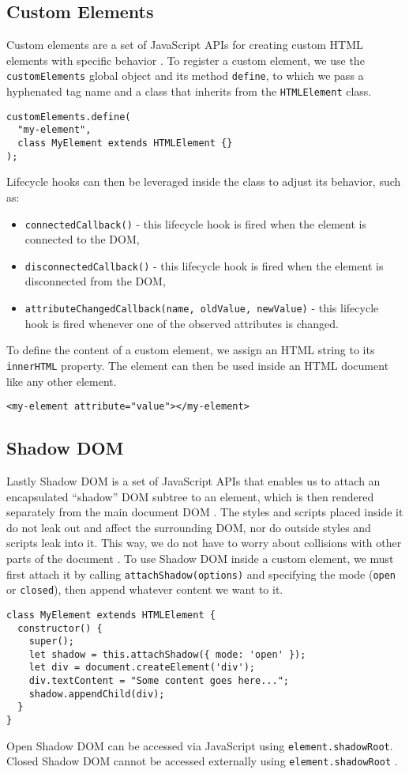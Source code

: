 \subsection{Custom Elements}
Custom elements are a set of JavaScript APIs for creating custom HTML elements with specific behavior \cite{MDNWebComponents}. To register a custom element, we use the \texttt{customElements} global object and its method \texttt{define}, to which we pass a hyphenated tag name and a class that inherits from the \texttt{HTMLElement} class.
\begin{verbatim}
customElements.define(
  "my-element", 
  class MyElement extends HTMLElement {}
);
\end{verbatim}
Lifecycle hooks can then be leveraged inside the class to adjust its behavior, such as:
\begin{itemize}
  \item \texttt{connectedCallback()} - this lifecycle hook is fired when the element is connected to the DOM,
  \item \texttt{disconnectedCallback()} - this lifecycle hook is fired when the element is disconnected from the DOM,
  \item \texttt{attributeChangedCallback(name, oldValue, newValue)} - this lifecycle hook is fired whenever one of the observed attributes is changed.
\end{itemize}
To define the content of a custom element, we assign an HTML string to its \texttt{innerHTML} property. The element can then be used inside an HTML document like any other element.
\begin{verbatim}
<my-element attribute="value"></my-element>
\end{verbatim}

\subsection{Shadow DOM}
Lastly Shadow DOM is a set of JavaScript APIs that enables us to attach an encapsulated ``shadow'' DOM subtree to an element, which is then rendered separately from the main document DOM \cite{MDNWebComponents}. The styles and scripts placed inside it do not leak out and affect the surrounding DOM, nor do outside styles and scripts leak into it. This way, we do not have to worry about collisions with other parts of the document \cite{EisenbergWebComponents}. To use Shadow DOM inside a custom element, we must first attach it by calling \texttt{attachShadow(options)} and specifying the mode (\texttt{open} or \texttt{closed}), then append whatever content we want to it.
\begin{verbatim}
class MyElement extends HTMLElement {
  constructor() {
    super();
    let shadow = this.attachShadow({ mode: 'open' });
    let div = document.createElement('div');
    div.textContent = "Some content goes here...";
    shadow.appendChild(div);
  }
}
\end{verbatim}
Open Shadow DOM can be accessed via JavaScript using \texttt{element.shadowRoot}. Closed Shadow DOM cannot be accessed externally using \texttt{element.shadowRoot} \cite{MDNWebComponents}.
